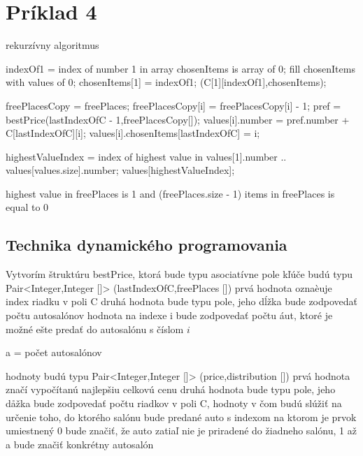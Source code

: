 \documentclass[paper=a4, fontsize=11pt]{scrartcl} %
\numberwithin{equation}{section} %
\numberwithin{figure}{section} %
\numberwithin{table}{section} %
\begin{document}
\section*{Príklad 4}

rekurzívny algoritmus

\begin{algorithmic}[1]
        \State indexOf1 = index of number 1 in array
	\State chosenItems is array of 0;
	\State fill chosenItems with values of 0;
	\State chosenItems[1] = indexOf1;
	\State \Return (C[1][indexOf1],chosenItems);
    \EndIf


            \State freePlacesCopy = freePlaces;			
            \State	freePlacesCopy[i] = freePlacesCopy[i] - 1;			
            \State	pref = bestPrice(lastIndexOfC - 1,freePlacesCopy[]);			
            \State	values[i].number = pref.number + C[lastIndexOfC][i]; 
	    \State	values[i].chosenItems[lastIndexOfC] = i;
        \EndIf
    \EndFor
	
    \State highestValueIndex = index of highest value in values[1].number .. values[values.size].number;
    \State \Return values[highestValueIndex];
\EndFunction

    \State \Return highest value in freePlaces is 1 and (freePlaces.size - 1) items in freePlaces is equal to 0
\EndFunction
\end{algorithmic}

\subsection*{Technika dynamického programovania}

Vytvorím štruktúru bestPrice, ktorá bude typu asociatívne pole
kľúče budú typu Pair<Integer,Integer []>
(lastIndexOfC,freePlaces [])
prvá hodnota oznaèuje index riadku v poli C
druhá hodnota bude typu pole, jeho dĺžka bude zodpovedať počtu autosalónov
hodnota na indexe i bude zodpovedať počtu áut, ktoré je možné ešte predať do autosalónu s číslom $i$

a = počet autosalónov

hodnoty budú typu Pair<Integer,Integer []>
(price,distribution [])
prvá hodnota značí vypočítanú najlepšiu celkovú cenu
druhá hodnota bude typu pole, jeho dåžka bude zodpovedať počtu riadkov v poli C,
hodnoty v čom budú slúžiť na určenie toho, do ktorého salónu bude predané auto s indexom na ktorom je prvok umiestnený
0 bude značiť, že auto zatiaľ nie je priradené do žiadneho salónu, 1 až a bude značiť konkrétny autosalón
\end{document}
